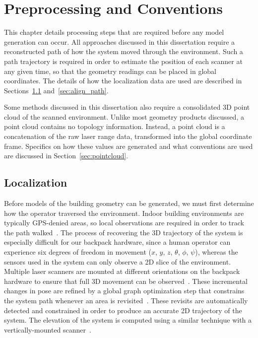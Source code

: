\documentclass[12pt,onecolumn,oneside]{book}
\begin{document}
\chapter{Preprocessing and Conventions}
\label{ch:preprocessing}

This chapter details processing steps that are required before any model generation can occur.  All approaches discussed in this dissertation require a reconstructed path of how the system moved through the environment.  Such a path trajectory is required in order to estimate the position of each scanner at any given time, so that the geometry readings can be placed in global coordinates.  The details of how the localization data are used are described in Sections~\ref{sec:localization} and~\ref{sec:align_path}.

Some methods discussed in this dissertation also require a consolidated 3D point cloud of the scanned environment.  Unlike most geometry products discussed, a point cloud contains no topology information.  Instead, a point cloud is a concatenation of the raw laser range data, transformed into the global coordinate frame.  Specifics on how these values are generated and what conventions are used are discussed in Section~\ref{sec:pointcloud}.

\section{Localization}
\label{sec:localization}

Before models of the building geometry can be generated, we must first determine how the operator traversed the environment.  Indoor building environments are typically GPS-denied areas, so local observations are required in order to track the path walked~\cite{Backpack,Localization,NickJournal}.  The process of recovering the 3D trajectory of the system is especially difficult for our backpack hardware, since a human operator can experience six degrees of freedom in movement ($x$, $y$, $z$, $\theta$, $\phi$, $\psi$), whereas the sensors used in the system can only observe a 2D slice of the environment.  Multiple laser scanners are mounted at different orientations on the backpack hardware to ensure that full 3D movement can be observed~\cite{NickJournal}.  These incremental changes in pose are refined by a global graph optimization step that constrains the system path whenever an area is revisited~\cite{toro07}.  These revisits are automatically detected and constrained in order to produce an accurate 2D trajectory of the system.  The elevation of the system is computed using a similar technique with a vertically-mounted scanner~\cite{Backpack}.
\end{document}
